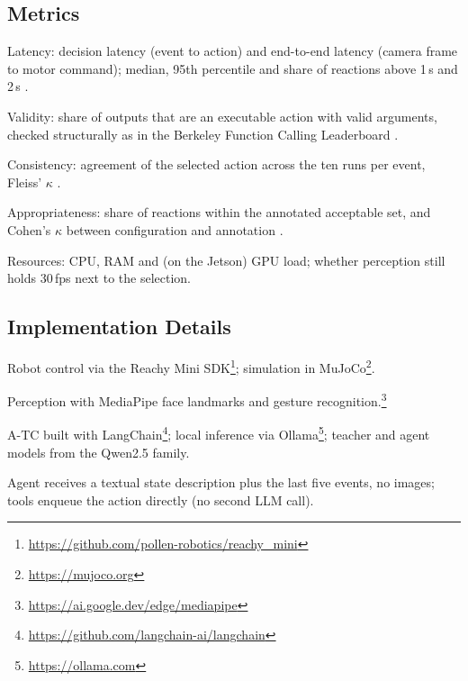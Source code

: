 \documentclass[conference]{IEEEtran}
\begin{document}
\subsection{Metrics}
\begin{points}
    \item Latency: decision latency (event to action) and end-to-end latency (camera frame to motor command); median, 95th percentile and share of reactions above 1\,s and 2\,s \cite{Shiwa2008Respond}.
    \item Validity: share of outputs that are an executable action with valid arguments, checked structurally as in the Berkeley Function Calling Leaderboard \cite{Patil2025BFCL}.
    \item Consistency: agreement of the selected action across the ten runs per event, Fleiss' $\kappa$ \cite{McHugh2012Kappa}.
    \item Appropriateness: share of reactions within the annotated acceptable set, and Cohen's $\kappa$ between configuration and annotation \cite{McHugh2012Kappa}.
    \item Resources: CPU, RAM and (on the Jetson) GPU load; whether perception still holds 30\,fps next to the selection.
\end{points}

\subsection{Implementation Details}
\begin{points}
    \item Robot control via the Reachy Mini SDK\footnote{\url{https://github.com/pollen-robotics/reachy_mini}}; simulation in MuJoCo\footnote{\url{https://mujoco.org}}.
    \item Perception with MediaPipe face landmarks and gesture recognition.\footnote{\url{https://ai.google.dev/edge/mediapipe}}
    \item A-TC built with LangChain\footnote{\url{https://github.com/langchain-ai/langchain}}; local inference via Ollama\footnote{\url{https://ollama.com}}; teacher and agent models from the Qwen2.5 family.
    \item Agent receives a textual state description plus the last five events, no images; tools enqueue the action directly (no second LLM call).
\end{points}

\end{document}
